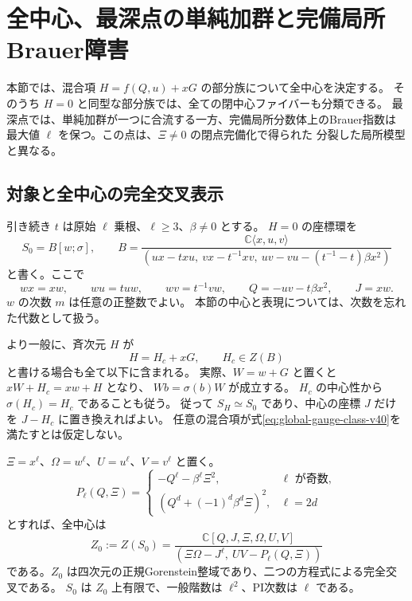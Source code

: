 \section{全中心、最深点の単純加群と完備局所Brauer障害}
\label{sec:global-center-v40}

本節では、混合項 $H=f(Q,u)+xG$ の部分族について全中心を決定する。
そのうち $H=0$ と同型な部分族では、全ての閉中心ファイバーも分類できる。
最深点では、単純加群が一つに合流する一方、完備局所分数体上のBrauer指数は
最大値 $\ell$ を保つ。この点は、$\Xi\ne0$ の閉点完備化で得られた
分裂した局所模型と異なる。

\subsection{対象と全中心の完全交叉表示}

引き続き $t$ は原始 $\ell$ 乗根、$\ell\ge3$、$\beta\ne0$ とする。
$H=0$ の座標環を
\[
 S_0=B[w;\sigma],\qquad
 B=\frac{\mathbb C\langle x,u,v\rangle}
 {(ux-txu,\ vx-t^{-1}xv,\ uv-vu-(t^{-1}-t)\beta x^2)}
\]
と書く。ここで
\[
 wx=xw,\qquad wu=tuw,\qquad wv=t^{-1}vw,
 \qquad Q=-uv-t\beta x^2,
 \qquad J=xw.
\]
$w$ の次数 $m$ は任意の正整数でよい。
本節の中心と表現については、次数を忘れた代数として扱う。

より一般に、斉次元 $H$ が
\begin{equation}\label{eq:global-gauge-class-v40}
 H=H_c+xG,\qquad H_c\in Z(B)
\end{equation}
と書ける場合も全て以下に含まれる。
実際、$W=w+G$ と置くと $xW+H_c=xw+H$ となり、
$Wb=\sigma(b)W$ が成立する。
$H_c$ の中心性から $\sigma(H_c)=H_c$ であることも従う。
従って $S_H\simeq S_0$ であり、中心の座標 $J$ だけを $J-H_c$ に置き換えればよい。
任意の混合項が式\eqref{eq:global-gauge-class-v40}を満たすとは仮定しない。

\begin{theorem}[全中心と正規性]\label{thm:global-center-v40}
$\Xi=x^\ell$、$\Omega=w^\ell$、$U=u^\ell$、$V=v^\ell$ と置く。
\[
 P_\ell(Q,\Xi)=
 \begin{cases}
  -Q^\ell-\beta^\ell\Xi^2,&\ell\text{ が奇数},\\
  (Q^d+(-1)^d\beta^d\Xi)^2,&\ell=2d
 \end{cases}
\]
とすれば、全中心は
\begin{equation}\label{eq:global-center-v40}
 Z_0:=Z(S_0)=
 \frac{\mathbb C[Q,J,\Xi,\Omega,U,V]}
 {(\Xi\Omega-J^\ell,\ UV-P_\ell(Q,\Xi))}
\end{equation}
である。$Z_0$ は四次元の正規Gorenstein整域であり、二つの方程式による完全交叉である。
$S_0$ は $Z_0$ 上有限で、一般階数は $\ell^2$、PI次数は $\ell$ である。
\end{theorem}

